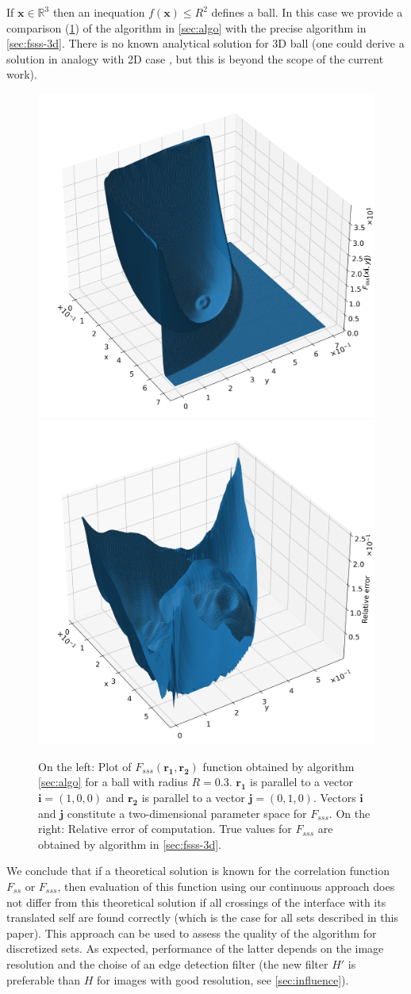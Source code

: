 \documentclass[preprint]{elsarticle}
\begin{document}
If $\bm{x} \in \mathbb{R}^3$ then an inequation $f(\bm{x}) \le R^2$ defines a
ball. In this case we provide a comparison (\cref{fig:fsss-ball}) of the
algorithm in \cref{sec:algo} with the precise algorithm in
\cref{sec:fsss-3d}. There is no known analytical solution for 3D ball (one could
derive a solution in analogy with 2D case \cite{Torquato_book}, but this is
beyond the scope of the current work).
\begin{figure}[!hpt]
  \centering
  \includegraphics[width=0.45\linewidth]{images/ball-sss.png}
  \hfill
  \includegraphics[width=0.45\linewidth]{images/ball-sss-error.png}
  \caption[]{On the left: Plot of $F_{sss}(\bm{r_1}, \bm{r_2})$ function
    obtained by algorithm \cref{sec:algo} for a ball with radius
    $R = 0.3$. $\bm{r_1}$ is parallel to a vector $\bm{i} = (1, 0, 0)$ and
    $\bm{r_2}$ is parallel to a vector $\bm{j} = (0, 1, 0)$. Vectors $\bm{i}$
    and $\bm{j}$ constitute a two-dimensional parameter space for $F_{sss}$. On
    the right: Relative error of computation. True values for $F_{sss}$ are
    obtained by algorithm in \cref{sec:fsss-3d}.}
  \label{fig:fsss-ball}
\end{figure}

We conclude that if a theoretical solution is known for the correlation function
$F_{ss}$ or $F_{sss}$, then evaluation of this function using our continuous
approach does not differ from this theoretical solution if all crossings of
the interface with its translated self are found correctly (which is the case
for all sets described in this paper). This approach can be used to assess the
quality of the algorithm for discretized sets. As expected, performance of the
latter depends on the image resolution and the choise of an edge detection
filter (the new filter $H'$ is preferable than $H$ for images with good
resolution, see \cref{sec:influence}).
\end{document}
